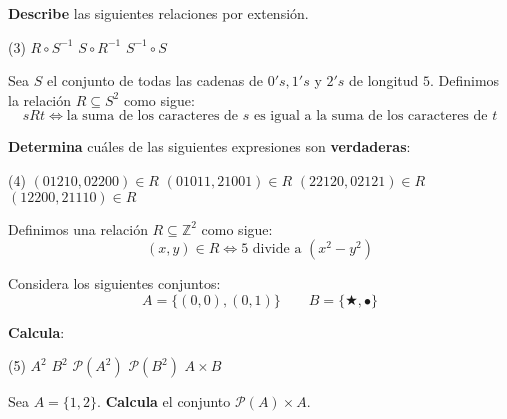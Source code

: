 \documentclass[oneside]{style}
\begin{document}
\begin{questions}[label=\protect\circled{\bfseries\arabic*}]
{        \textbf{Describe} las siguientes relaciones por extensión.
        \begin{tasks}(3)
            \task $R \circ S^{-1}$
            \task $S \circ R^{-1}$
            \task $S^{-1} \circ S$
        \end{tasks}
    }

    \question
    {
        Sea $S$ el conjunto de todas las cadenas de $0's, 1's$ y $2's$ de 
        longitud $5$. Definimos la relación $R \subseteq S^2$ como sigue:
        \begin{equation*}
            s R t \Leftrightarrow \text{la suma de los caracteres de } s 
            \text{ es igual a la suma de los caracteres de } t
        \end{equation*}

        \textbf{Determina} cuáles de las siguientes expresiones son 
        \textbf{verdaderas}:
        \begin{tasks}(4)
            \task $(01210, 02200) \in R$
            \task $(01011, 21001) \in R$
            \task $(22120, 02121) \in R$
            \task $(12200, 21110) \in R$
        \end{tasks}
    }

    \question
    {
        Definimos una relación $R \subseteq \mathbb{Z}^2$ como sigue:
        \begin{equation*}
            (x,y) \in R \Leftrightarrow 5 \text{ divide a } (x^2-y^2)
        \end{equation*}
    }

    \question
    {
        Considera los siguientes conjuntos:
        \begin{equation*}
            A = \{(0,0), (0,1)\} \quad \quad B = \{\bigstar, \bullet\}
        \end{equation*} 

        \textbf{Calcula}:
        \begin{tasks}(5)
            \task $A^2$
            \task $B^2$
            \task $\mathcal{P}(A^2)$ 
            \task $\mathcal{P}(B^2)$
            \task $A \times B$
        \end{tasks}
    }


    \question
    {
        Sea $A = \{1,2\}$. \textbf{Calcula} el conjunto 
        $\mathcal{P}(A) \times A$. 
    }


\end{questions}
\end{document}
